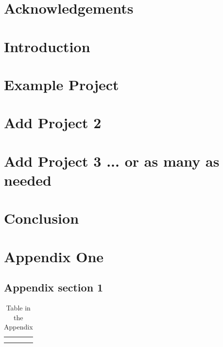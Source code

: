 \documentclass[11pt]{book}
\begin{document}

\doublespacing



\chapter*{Acknowledgements}



\tableofcontents{}
\listoffigures
\listoftables
\clearpage

\chapter {Introduction}


\chapter{Example Project} %
\label{chapter:two}


\chapter{Add Project 2} %
\label{chapter:three}

\chapter{Add Project 3 ... or as many as needed} %
\label{chapter:four}


\chapter{Conclusion}





\newpage
\newcommand{\beginsupplement}{%
    \setcounter{chapter}{0}
    \renewcommand{\thechapter}{\Alph{chapter}}%
 }

\beginsupplement
\chapter{Appendix One}
\section{Appendix section 1}
\begin{table}[]
    \centering
    \begin{tabular}{c|c}
         &  \\
         & 
    \end{tabular}
    \caption{Table in the Appendix}
    \label{tab:my_label}
\end{table}
\end{document}
